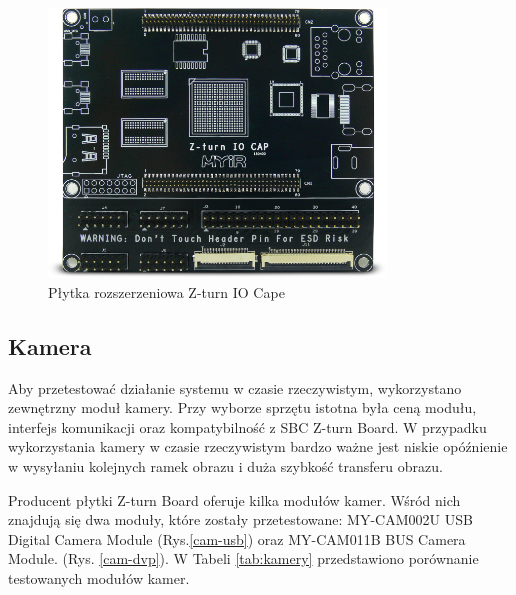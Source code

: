 \begin{figure}[h]
  \centering
  \includegraphics[width=0.8\textwidth]{img/iocape.png}
  \caption{Płytka rozszerzeniowa Z-turn IO Cape}
  \label{iocape}
\end{figure}

\subsection{Kamera}

Aby przetestować działanie systemu w czasie rzeczywistym, wykorzystano zewnętrzny 
moduł kamery. Przy wyborze sprzętu istotna była ceną modułu, interfejs komunikacji
oraz kompatybilność z SBC Z-turn Board. W przypadku wykorzystania kamery w czasie 
rzeczywistym bardzo ważne jest niskie opóźnienie w wysyłaniu kolejnych ramek obrazu i duża szybkość transferu obrazu. 

Producent płytki Z-turn Board oferuje kilka modułów kamer. Wśród nich znajdują się dwa moduły, które zostały przetestowane: 
MY-CAM002U USB Digital Camera Module (Rys.\ref{cam-usb}) oraz MY-CAM011B BUS Camera Module. (Rys. \ref{cam-dvp}). W Tabeli 
\ref{tab:kamery} przedstawiono porównanie testowanych modułów kamer. 

